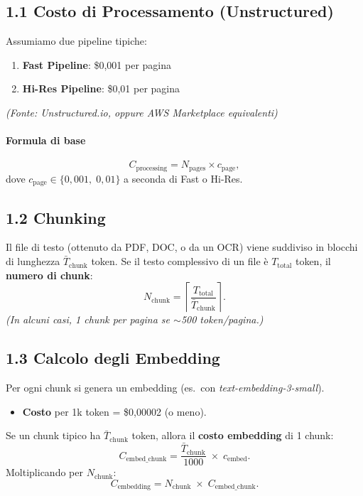 \documentclass{article}
\begin{document}
\subsection*{1.1 Costo di Processamento (Unstructured)}
Assumiamo due pipeline tipiche:

\begin{enumerate}
    \item \textbf{Fast Pipeline}: \$0,001 per pagina
    \item \textbf{Hi-Res Pipeline}: \$0,01 per pagina
\end{enumerate}

\emph{(Fonte: Unstructured.io, oppure AWS Marketplace equivalenti)}

\paragraph{Formula di base}
\[
C_{\text{processing}}
=
N_{\text{pages}} \times c_{\text{page}},
\]
dove \(c_{\text{page}} \in \{0,001, \; 0,01\}\) a seconda di Fast o Hi-Res.

\subsection*{1.2 Chunking}
Il file di testo (ottenuto da PDF, DOC, o da un OCR) viene suddiviso in blocchi di lunghezza \(\bar{T}_{\text{chunk}}\) token. Se il testo complessivo di un file è \(T_{\text{total}}\) token, il \textbf{numero di chunk}:
\[
N_{\text{chunk}}
=
\left\lceil
\frac{T_{\text{total}}}{\bar{T}_{\text{chunk}}}
\right\rceil.
\]
\emph{(In alcuni casi, 1 chunk per pagina se $\sim$500 token/pagina.)}

\subsection*{1.3 Calcolo degli Embedding}
Per ogni chunk si genera un embedding (es.\ con \emph{text-embedding-3-small}).
\begin{itemize}
    \item \textbf{Costo} per 1k token = \$0,00002 (o meno).
\end{itemize}
Se un chunk tipico ha \(\bar{T}_{\text{chunk}}\) token, allora il \textbf{costo embedding} di 1 chunk:
\[
C_{\text{embed\_chunk}}
=
\frac{\bar{T}_{\text{chunk}}}{1000}
\;\times\;
c_{\text{embed}}.
\]
Moltiplicando per $N_{\text{chunk}}$:
\[
C_{\text{embedding}}
=
N_{\text{chunk}}
\;\times\;
C_{\text{embed\_chunk}}.
\]
\end{document}
